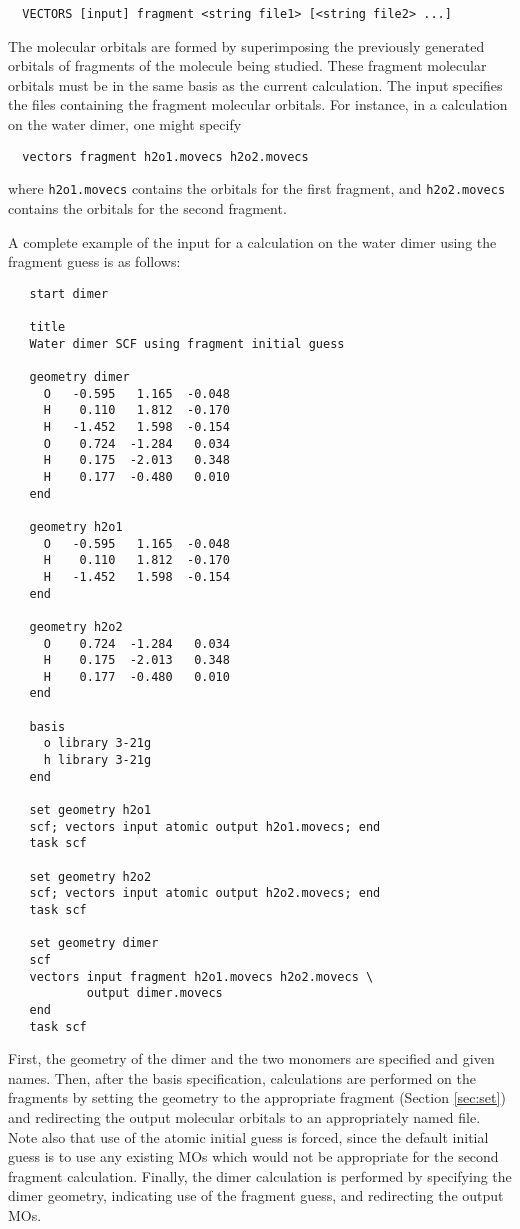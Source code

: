 \begin{verbatim}
  VECTORS [input] fragment <string file1> [<string file2> ...]
\end{verbatim}
The molecular orbitals are formed by superimposing the previously
generated orbitals of fragments of the molecule being studied.  These
fragment molecular orbitals must be in the same basis as the current
calculation.  The input specifies the files containing the fragment
molecular orbitals.  For instance, in a calculation on the water
dimer, one might specify
\begin{verbatim}
  vectors fragment h2o1.movecs h2o2.movecs
\end{verbatim}
where \verb+h2o1.movecs+ contains the orbitals for the first fragment, and
\verb+h2o2.movecs+ contains the orbitals for the second fragment.

A complete example of the input for a calculation on the water
dimer using the fragment guess is as follows:
\begin{verbatim}
   start dimer

   title
   Water dimer SCF using fragment initial guess

   geometry dimer
     O   -0.595   1.165  -0.048
     H    0.110   1.812  -0.170
     H   -1.452   1.598  -0.154
     O    0.724  -1.284   0.034
     H    0.175  -2.013   0.348
     H    0.177  -0.480   0.010
   end

   geometry h2o1
     O   -0.595   1.165  -0.048
     H    0.110   1.812  -0.170
     H   -1.452   1.598  -0.154
   end

   geometry h2o2
     O    0.724  -1.284   0.034
     H    0.175  -2.013   0.348
     H    0.177  -0.480   0.010
   end

   basis
     o library 3-21g
     h library 3-21g
   end

   set geometry h2o1
   scf; vectors input atomic output h2o1.movecs; end
   task scf

   set geometry h2o2
   scf; vectors input atomic output h2o2.movecs; end
   task scf

   set geometry dimer
   scf
   vectors input fragment h2o1.movecs h2o2.movecs \
           output dimer.movecs
   end
   task scf
\end{verbatim}
First, the geometry of the dimer and the two monomers are specified
and given names.  Then, after the basis specification, calculations
are performed on the fragments by setting the geometry to the
appropriate fragment (Section \ref{sec:set}) and redirecting the
output molecular orbitals to an appropriately named file.  Note also
that use of the atomic initial guess is forced, since the default
initial guess is to use any existing MOs which would not be
appropriate for the second fragment calculation.  Finally, the dimer
calculation is performed by specifying the dimer geometry, indicating
use of the fragment guess, and redirecting the output MOs.

